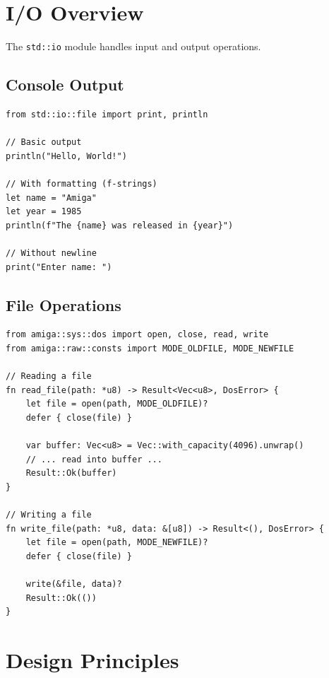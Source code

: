\section{I/O Overview}
\label{sec:stdlib-io}

The \texttt{std::io} module handles input and output operations.

\subsection{Console Output}

\begin{lstlisting}
from std::io::file import print, println

// Basic output
println("Hello, World!")

// With formatting (f-strings)
let name = "Amiga"
let year = 1985
println(f"The {name} was released in {year}")

// Without newline
print("Enter name: ")
\end{lstlisting}

\subsection{File Operations}

\begin{lstlisting}
from amiga::sys::dos import open, close, read, write
from amiga::raw::consts import MODE_OLDFILE, MODE_NEWFILE

// Reading a file
fn read_file(path: *u8) -> Result<Vec<u8>, DosError> {
    let file = open(path, MODE_OLDFILE)?
    defer { close(file) }

    var buffer: Vec<u8> = Vec::with_capacity(4096).unwrap()
    // ... read into buffer ...
    Result::Ok(buffer)
}

// Writing a file
fn write_file(path: *u8, data: &[u8]) -> Result<(), DosError> {
    let file = open(path, MODE_NEWFILE)?
    defer { close(file) }

    write(&file, data)?
    Result::Ok(())
}
\end{lstlisting}

\section{Design Principles}
\label{sec:stdlib-principles}

